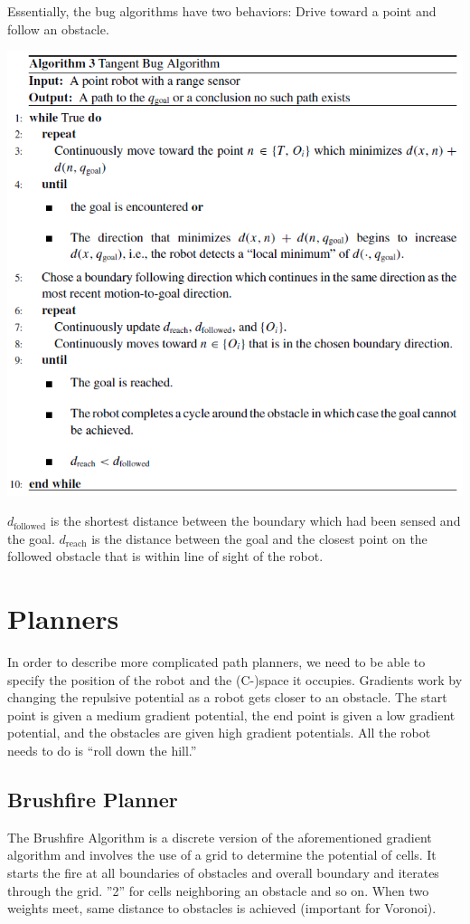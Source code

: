 \begin{multicols*}{2}
\noindent Essentially, the bug algorithms have two behaviors: Drive toward a point and follow an obstacle.

\begin{center}
\includegraphics[width=\columnwidth]{tangential_bug_pseudocode.PNG}
\end{center}
$d_{\text{followed}}$ is the shortest distance between the boundary which had been sensed and the goal.
$d_{\text{reach}}$ is the distance between the goal and the closest point on the followed obstacle that is within line of sight of the robot.

\section{Planners}
In order to describe more complicated path planners, we need to be able to specify the position of the robot and the (C-)space it occupies.
Gradients work by changing the repulsive potential as a robot gets closer to an obstacle. The start point is given a medium gradient potential, the end point is given a low gradient potential, and the obstacles are given high gradient potentials.
All the robot needs to do is “roll down the hill.”

\subsection{Brushfire Planner}
The Brushfire Algorithm is a discrete version of the aforementioned gradient algorithm and involves the use of a grid to determine the potential of cells.
It starts the fire at all boundaries of obstacles and overall boundary and iterates through the grid.
”2” for cells neighboring an obstacle and so on.
When two weights meet, same distance to obstacles is achieved (important for Voronoi).


\end{multicols*}
